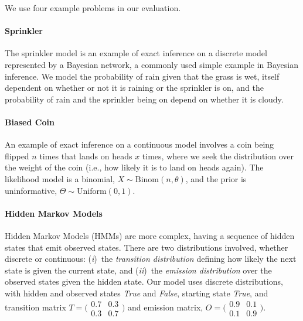 \documentclass[sigconf]{acmart}
\newcommand{\one}{({\em i})\/}
\newcommand{\two}{({\em ii})\/}
\begin{document}
We use four example problems in our evaluation.

\paragraph{Sprinkler}
The sprinkler model is an example of exact inference on a discrete model represented by a Bayesian network, %
a commonly used simple example in Bayesian inference. We model the probability of rain given that the grass is wet, itself dependent on whether or not it is raining or the sprinkler is on, and the probability of rain and the sprinkler being on depend on whether it is cloudy.

\paragraph{Biased Coin}
An example of exact inference on a continuous model involves a coin being flipped $n$ times that lands on heads $x$ times, where we seek the distribution over the weight of the coin (i.e., how likely it is to land on heads again). The likelihood model is a binomial, $X \sim \text{Binom}(n,\theta)$, and the prior is uninformative, $\Theta \sim \text{Uniform}(0,1)$.

\paragraph{Hidden Markov Models}
Hidden Markov Models (HMMs) are more complex, having a sequence of hidden states that emit observed states. There are two distributions involved, whether discrete or continuous: \one~the \emph{transition distribution} defining how likely the next state is given the current state, and \two~the \emph{emission distribution} over the observed states given the hidden state. Our model uses discrete distributions, with hidden and observed states \emph{True} and \emph{False}, starting state \emph{True}, and transition matrix
$T = \big(\begin{smallmatrix}
  0.7 & 0.3 \\
  0.3 & 0.7
\end{smallmatrix}\big)$
and emission matrix,
$O = \big(\begin{smallmatrix}
  0.9 & 0.1 \\
  0.1 & 0.9
\end{smallmatrix}\big)$.
\end{document}
